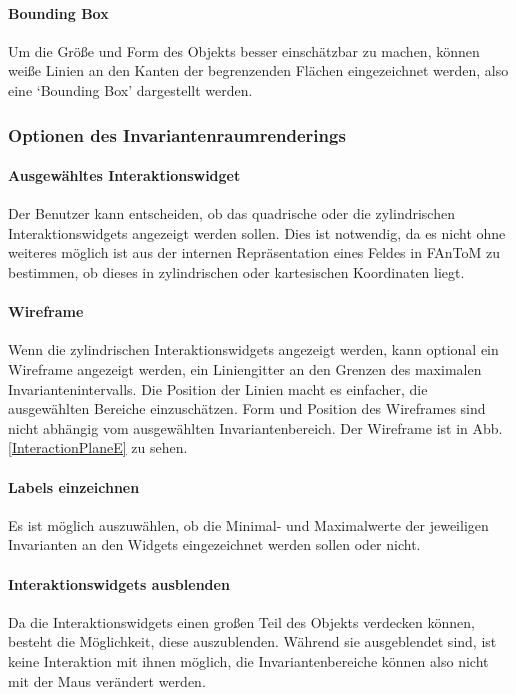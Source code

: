 \documentclass[a4paper,fontsize=12pt,toc=bib,halfparskip]{scrartcl}
\begin{document}
\paragraph{Bounding Box}
Um die Gr\"o{\ss}e und Form des Objekts besser einsch\"atzbar zu machen, k\"onnen wei{\ss}e Linien an den Kanten der begrenzenden Fl\"achen eingezeichnet werden, also eine `Bounding Box' dargestellt werden.

\subsubsection{Optionen des Invariantenraumrenderings}

\paragraph{Ausgew\"ahltes Interaktionswidget}
Der Benutzer kann entscheiden, ob das quadrische oder die zylindrischen Interaktionswidgets angezeigt werden sollen. Dies ist notwendig, da es nicht ohne weiteres m\"oglich ist aus der internen Repr\"asentation eines Feldes in FAnToM zu bestimmen, ob dieses in zylindrischen oder kartesischen Koordinaten liegt.

\paragraph{Wireframe}
Wenn die zylindrischen Interaktionswidgets angezeigt werden, kann optional ein Wireframe angezeigt werden, ein Liniengitter an den Grenzen des maximalen Invariantenintervalls. Die Position der Linien macht es einfacher, die ausgew\"ahlten Bereiche einzusch\"atzen. Form und Position des Wireframes sind nicht abh\"angig vom ausgew\"ahlten Invariantenbereich. Der Wireframe ist in Abb. \ref{InteractionPlaneE} zu sehen.

\paragraph{Labels einzeichnen}
Es ist m\"oglich auszuw\"ahlen, ob die Minimal- und Maximalwerte der jeweiligen Invarianten an den Widgets eingezeichnet werden sollen oder nicht.

\paragraph{Interaktionswidgets ausblenden}
Da die Interaktionswidgets einen gro{\ss}en Teil des Objekts verdecken k\"onnen, besteht die M\"oglichkeit, diese auszublenden. W\"ahrend sie ausgeblendet sind, ist keine Interaktion mit ihnen m\"oglich, die Invariantenbereiche k\"onnen also nicht mit der Maus ver\"andert werden.
\end{document}
